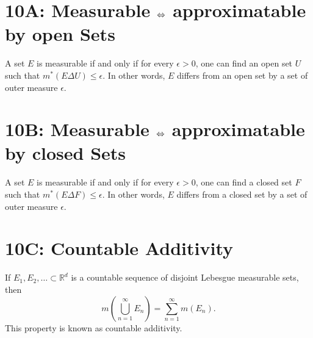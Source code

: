 \documentclass[lang=cn,11pt]{template}
\begin{document}
\section*{10A: Measurable $\Leftrightarrow$ approximatable by open Sets}
A set \( E \) is measurable if and only if for every \( \epsilon > 0 \), one can find an open set \( U \) such that \( m^*(E \Delta U) \leq \epsilon \). In other words, \( E \) differs from an open set by a set of outer measure \( \epsilon \).

\section*{10B: Measurable $\Leftrightarrow$ approximatable by closed Sets}
A set \( E \) is measurable if and only if for every \( \epsilon > 0 \), one can find a closed set \( F \) such that \( m^*(E \Delta F) \leq \epsilon \). In other words, \( E \) differs from a closed set by a set of outer measure \( \epsilon \).

\section*{10C: Countable Additivity}
\begin{theorem}
If \( E_1, E_2, \dots \subset \mathbb{R}^d \) is a countable sequence of disjoint Lebesgue measurable sets, then
\[
m\left( \bigcup_{n=1}^{\infty} E_n \right) = \sum_{n=1}^{\infty} m(E_n).
\]
This property is known as countable additivity.
\end{theorem}


\end{document}
